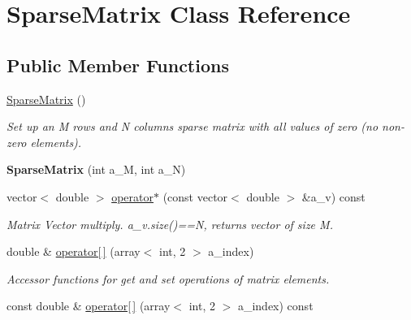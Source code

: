 \hypertarget{classSparseMatrix}{
\section{SparseMatrix Class Reference}
\label{classSparseMatrix}
}
\subsection*{Public Member Functions}
\begin{DoxyCompactItemize}
\item 
\hypertarget{classSparseMatrix_ac010252479e500b34324cb10c9dd4e98}{
\hyperlink{classSparseMatrix_ac010252479e500b34324cb10c9dd4e98}{SparseMatrix} ()}
\label{classSparseMatrix_ac010252479e500b34324cb10c9dd4e98}

\begin{DoxyCompactList}\small\item\em Set up an M rows and N columns sparse matrix with all values of zero (no non-\/zero elements). \item\end{DoxyCompactList}\item 
\hypertarget{classSparseMatrix_a6101bde1c725b956a98012869bdc6b4d}{
{\bfseries SparseMatrix} (int a\_\-M, int a\_\-N)}
\label{classSparseMatrix_a6101bde1c725b956a98012869bdc6b4d}

\item 
\hypertarget{classSparseMatrix_ad81dcbd6d9aee8a21af04ca8cee85f88}{
vector$<$ double $>$ \hyperlink{classSparseMatrix_ad81dcbd6d9aee8a21af04ca8cee85f88}{operator$\ast$} (const vector$<$ double $>$ \&a\_\-v) const }
\label{classSparseMatrix_ad81dcbd6d9aee8a21af04ca8cee85f88}

\begin{DoxyCompactList}\small\item\em Matrix Vector multiply. a\_\-v.size()==N, returns vector of size M. \item\end{DoxyCompactList}\item 
\hypertarget{classSparseMatrix_a0f9689dc47ea6371993d0bf8f58978bc}{
double \& \hyperlink{classSparseMatrix_a0f9689dc47ea6371993d0bf8f58978bc}{operator\mbox{[}$\,$\mbox{]}} (array$<$ int, 2 $>$ a\_\-index)}
\label{classSparseMatrix_a0f9689dc47ea6371993d0bf8f58978bc}

\begin{DoxyCompactList}\small\item\em Accessor functions for get and set operations of matrix elements. \item\end{DoxyCompactList}\item 
\hypertarget{classSparseMatrix_a0e97b4e129c923b3828a263f878ebfa4}{
const double \& \hyperlink{classSparseMatrix_a0e97b4e129c923b3828a263f878ebfa4}{operator\mbox{[}$\,$\mbox{]}} (array$<$ int, 2 $>$ a\_\-index) const }
\label{classSparseMatrix_a0e97b4e129c923b3828a263f878ebfa4}


\end{DoxyCompactItemize}

